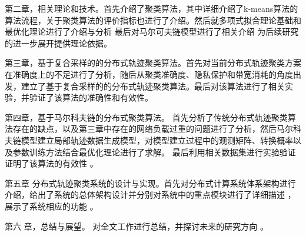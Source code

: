 第二章，相关理论和技术。首先介绍了聚类算法，其中详细介绍了k-means算法的算法流程，关于聚类算法的评价指标也进行了介绍。然后就多项式拟合理论基础和最优化理论进行了介绍与分析 最后对马尔可夫链模型进行了相关介绍 为后续研究的进一步展开提供理论依据。

第三章，基于复合采样的的分布式轨迹聚类算法。首先对当前分布式轨迹聚类方案在准确度上的不足进行了分析，随后从聚类准确度、隐私保护和带宽消耗的角度出发，建立了基于复合采样的的分布式轨迹聚类算法。最后对该算法进行了相关实验，并验证了该算法的准确性和有效性。

第四章，基于马尔科夫链的分布式聚类算法。 首先分析了传统分布式轨迹聚类算法存在的缺点，以及第三章中存在的网络负载过重的问题进行了分析，然后马尔科夫链模型建立局部轨迹数据生成模型，对模型建立过程中的观测矩阵、转换概率以及参数训练方法结合最优化理论进行了求解。 最后利用相关数据集进行实验验证证明了该算法的有效性 。

第五章 分布式轨迹聚类系统的设计与实现。首先对分布式计算系统体系架构进行介绍，给出了系统的总体架构设计并分别对系统中的重点模块进行了详细描述 ，展示了系统相应的功能 。

第六 章，总结与展望。 对全文工作进行总结，并探讨未来的研究方向 。
